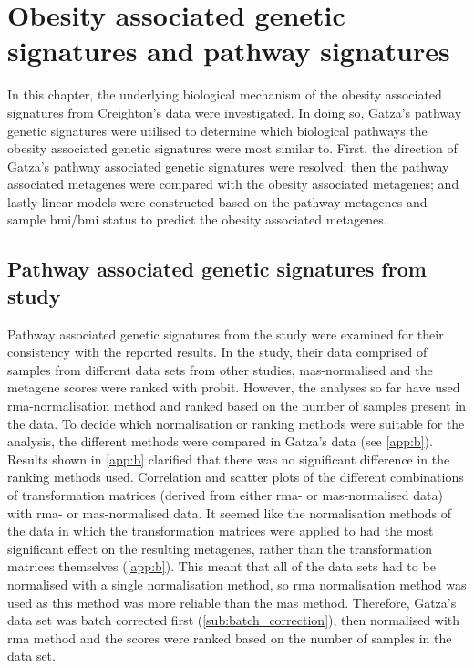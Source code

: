 \chapter{Obesity associated genetic signatures and pathway signatures}
\label{cha:obesity_associated_genetic_signature_and_pathway_signatures}

In this chapter, the underlying biological mechanism of the obesity associated signatures from Creighton's data were investigated.
In doing so, Gatza's pathway genetic signatures were utilised to determine which biological pathways the obesity associated genetic signatures were most similar to.
First, the direction of Gatza's pathway associated genetic signatures were resolved; then the pathway associated metagenes were compared with the obesity associated metagenes; and lastly linear models were constructed based on the pathway metagenes and sample \gls{bmi}/\gls{bmi} status to predict the obesity associated metagenes.

\section{Pathway associated genetic signatures from \citet{Gatza2010a} study}
\label{sec:pathway_associated_genetic_signatures_from_gatza2010a_study}

Pathway associated genetic signatures from the \citet{Gatza2010a} study were examined for their consistency with the reported results.
In the \citet{Gatza2010a} study, their data comprised of samples from different data sets from other studies, \gls{mas}-normalised and the metagene scores were ranked with probit.
However, the analyses so far have used \gls{rma}-normalisation method and ranked based on the number of samples present in the data.
To decide which normalisation or ranking methods were suitable for the analysis, the different methods were compared in Gatza's data (see \cref{app:b}).
Results shown in \cref{app:b} clarified that there was no significant difference in the ranking methods used.
Correlation and scatter plots of the different combinations of transformation matrices (derived from either \gls{rma}- or \gls{mas}-normalised data) with \gls{rma}- or \gls{mas}-normalised data.
It seemed like the normalisation methods of the data in which the transformation matrices were applied to had the most significant effect on the resulting metagenes, rather than the transformation matrices themselves (\cref{app:b}).
This meant that all of the data sets had to be normalised with a single normalisation method, so \gls{rma} normalisation method was used as this method was more reliable than the \gls{mas} method.
Therefore, Gatza's data set was batch corrected first (\cref{sub:batch_correction}), then normalised with \gls{rma} method and the scores were ranked based on the number of samples in the data set.

